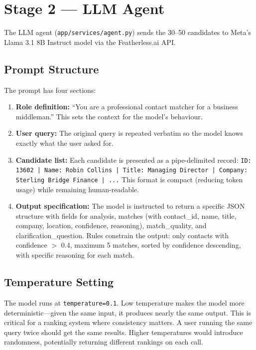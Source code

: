 \documentclass[12pt, a4paper]{report}
\begin{document}
\section{Stage 2 --- LLM Agent}

The LLM agent (\texttt{app/services/agent.py}) sends the 30--50 candidates to Meta's Llama 3.1 8B Instruct model via the Featherless.ai API.

\subsection{Prompt Structure}

The prompt has four sections:

\begin{enumerate}[itemsep=4pt]
    \item \textbf{Role definition:} ``You are a professional contact matcher for a business middleman.'' This sets the context for the model's behaviour.
    \item \textbf{User query:} The original query is repeated verbatim so the model knows exactly what the user asked for.
    \item \textbf{Candidate list:} Each candidate is presented as a pipe-delimited record: \texttt{ID: 13602 | Name: Robin Collins | Title: Managing Director | Company: Sterling Bridge Finance | ...} This format is compact (reducing token usage) while remaining human-readable.
    \item \textbf{Output specification:} The model is instructed to return a specific JSON structure with fields for analysis, matches (with contact\_id, name, title, company, location, confidence, reasoning), match\_quality, and clarification\_question. Rules constrain the output: only contacts with confidence $>$ 0.4, maximum 5 matches, sorted by confidence descending, with specific reasoning for each match.
\end{enumerate}

\subsection{Temperature Setting}

The model runs at \texttt{temperature=0.1}. Low temperature makes the model more deterministic---given the same input, it produces nearly the same output. This is critical for a ranking system where consistency matters. A user running the same query twice should get the same results. Higher temperatures would introduce randomness, potentially returning different rankings on each call.
\end{document}
